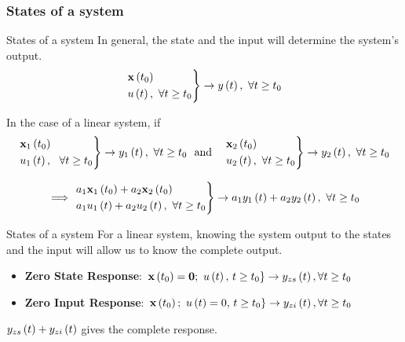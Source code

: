 \documentclass[aspectratio=169]{beamer}
\def\mf{\ensuremath\mathbf}
\def\lp{\ensuremath\left(}
\def\rp{\ensuremath\right)}
\begin{document}
\begin{frame}[t]
    \frametitle{States of a  system}
    
\end{frame}


\begin{frame}{States of a system}
In general, the state and the input will determine the system's output.
\[ \begin{rcases}
\mf{x}\lp t_0 \rp \\
u\lp t\rp, \,\, \forall t \geq t_0
\end{rcases} \rightarrow y\lp t\rp, \,\, \forall t \geq t_0 \]

In the case of a linear system, if 
\[ \begin{rcases}
\mf{x}_1\lp t_0 \rp \\
u_1\lp t\rp, \,\,\,\, \forall t \geq t_0
\end{rcases} \rightarrow y_1\lp t\rp, \,\, \forall t \geq t_0 \,\, \text{ and }\,\,\,\, 
\begin{rcases}
\mf{x}_2\lp t_0 \rp \\
u_2\lp t\rp, \,\, \forall t \geq t_0
\end{rcases} \rightarrow y_2\lp t\rp, \,\, \forall t \geq t_0
\]

\[ \implies \begin{rcases}
a_1\mf{x}_1\lp t_0 \rp + a_2\mf{x}_2\lp t_0 \rp \\
a_1u_1\lp t\rp + a_2u_2\lp t\rp, \,\, \forall t \geq t_0
\end{rcases} \rightarrow a_1y_1\lp t\rp + a_2y_2\lp t\rp, \,\, \forall t \geq t_0
\]
\end{frame}


\begin{frame}[t]{States of a system}
For a linear system, knowing the system output to the states and the input will allow us to know the complete output.

\begin{itemize}
  \item \textbf{Zero State Response}: $\left. \mf{x}\lp t_0\rp = \mf{0}; \,\, u\lp t\rp, \, t \geq t_0\right\} \rightarrow y_{zs}\lp t\rp, \forall t \geq t_0$
  \item \textbf{Zero Input Response}: $\left. \mf{x}\lp t_0\rp; \,\, u\lp t\rp = 0, \, t \geq t_0\right\} \rightarrow y_{zi}\lp t\rp, \forall t \geq t_0$
\end{itemize}
\vspace{0.5cm}
$y_{zs}\lp t\rp + y_{zi}\lp t\rp$ gives the complete response.
\end{frame}
\end{document}
